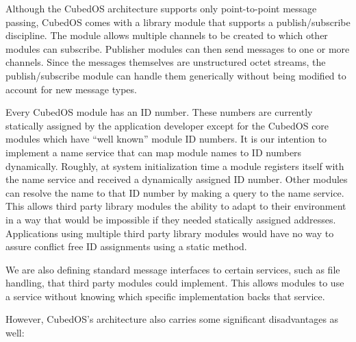 Although the CubedOS architecture supports only point-to-point message passing, CubedOS comes
with a library module that supports a publish/subscribe discipline. The module allows multiple
channels to be created to which other modules can subscribe. Publisher modules can then send
messages to one or more channels. Since the messages themselves are unstructured octet streams,
the publish/subscribe module can handle them generically without being modified to account for
new message types.

Every CubedOS module has an ID number. These numbers are currently statically assigned by the
application developer except for the CubedOS core modules which have ``well known'' module ID
numbers. It is our intention to implement a name service that can map module names to ID numbers
dynamically. Roughly, at system initialization time a module registers itself with the name
service and received a dynamically assigned ID number. Other modules can resolve the name to
that ID number by making a query to the name service. This allows third party library modules
the ability to adapt to their environment in a way that would be impossible if they needed
statically assigned addresses. Applications using multiple third party library modules would
have no way to assure conflict free ID assignments using a static method.

We are also defining standard message interfaces to certain services, such as file handling,
that third party modules could implement. This allows modules to use a service without knowing
which specific implementation backs that service.

However, CubedOS's architecture also carries some significant disadvantages as well:

